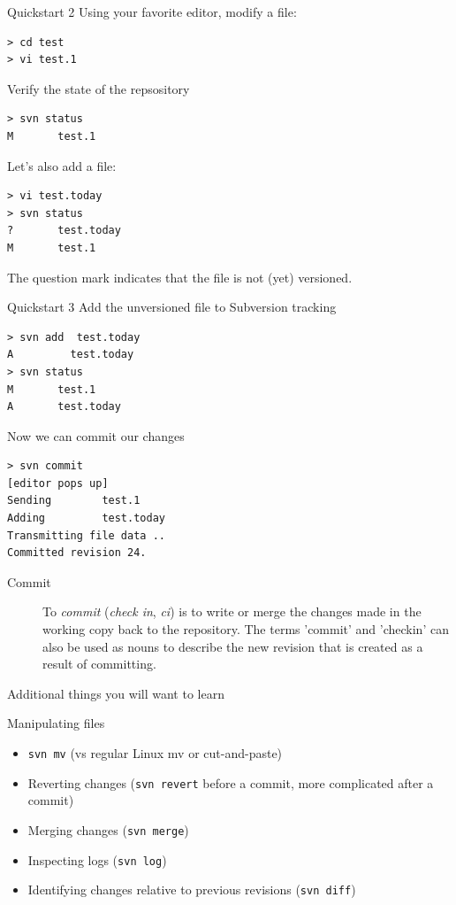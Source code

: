 \documentclass[xcolor=table,compress]{beamer}
\begin{document}
\begin{frame}[fragile]{Quickstart 2}
Using your favorite editor, modify a file:
\begin{lstlisting}
> cd test
> vi test.1
\end{lstlisting}
\pause
Verify the state of the repsository
\begin{lstlisting}
> svn status
M       test.1
\end{lstlisting}
\pause Let's also add a file:
\begin{lstlisting}
> vi test.today
> svn status
?       test.today
M       test.1
\end{lstlisting}
The question mark indicates that the file is not (yet) versioned.
\end{frame}



\begin{frame}[fragile]{Quickstart 3}
Add the unversioned file to Subversion tracking
\begin{lstlisting}
> svn add  test.today
A         test.today
> svn status
M       test.1
A       test.today
\end{lstlisting}
\pause
Now we can commit our changes
\begin{lstlisting}
> svn commit
[editor pops up]
Sending        test.1
Adding         test.today
Transmitting file data ..
Committed revision 24.
\end{lstlisting}
\small
\begin{description}
\item[Commit] 
To \textit{commit} (\textit{check in}, \textit{ci}) is to write or merge the changes made in the working copy back to the repository. The terms 'commit' and 'checkin' can also be used as nouns to describe the new revision that is created as a result of committing.
\end{description}
\end{frame}



\begin{frame}{Additional things you will want to learn}
\begin{block}{Manipulating files}
\begin{itemize}
\item \texttt{svn mv} (vs regular Linux mv or cut-and-paste)
\item Reverting changes (\texttt{svn revert} before a commit, more complicated after a commit)
\item Merging changes (\texttt{svn merge})
\item Inspecting logs (\texttt{svn log})
\item Identifying changes relative to previous revisions (\texttt{svn diff})
\end{itemize}
\end{block}
\end{frame}
\end{document}
